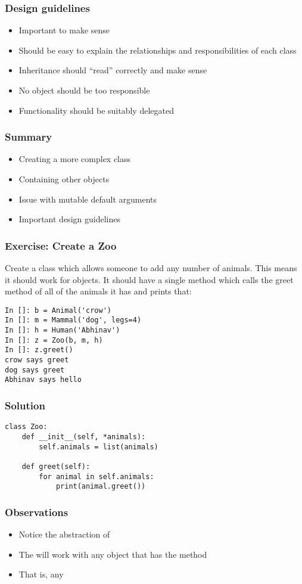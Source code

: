 \documentclass[14pt,compress,aspectratio=169]{beamer}
\begin{document}
\begin{frame}
  \frametitle{Design guidelines}
  \begin{itemize}
  \item Important to make sense
  \item Should be easy to explain the relationships and responsibilities of
    each class
  \item Inheritance should ``read'' correctly and make sense
  \item No object should be too responsible
  \item Functionality should be suitably delegated
  \end{itemize}
\end{frame}

\begin{frame}
  \frametitle{Summary}
  \begin{itemize}
  \item Creating a more complex class
  \item Containing other objects
  \item Issue with mutable default arguments
  \item Important design guidelines
  \end{itemize}
\end{frame}

\begin{frame}
  \frametitle{Exercise: Create a Zoo}
  \begin{block}{}
    Create a  class which allows someone to add any number of animals.
    This means it should work for  objects. It
    should have a single  method which calls the greet method of all
    of the animals it has and prints that:
  \end{block}

\begin{lstlisting}
In []: b = Animal('crow')
In []: m = Mammal('dog', legs=4)
In []: h = Human('Abhinav')
In []: z = Zoo(b, m, h)
In []: z.greet()
crow says greet
dog says greet
Abhinav says hello
\end{lstlisting}
\end{frame}


\begin{frame}
  \frametitle{Solution}
\begin{lstlisting}
class Zoo:
    def __init__(self, *animals):
        self.animals = list(animals)

    def greet(self):
        for animal in self.animals:
            print(animal.greet())
\end{lstlisting}
\end{frame}

\begin{frame}
  \frametitle{Observations}
  \begin{itemize}
  \item Notice the abstraction of 
  \item The  will work with any object that has the  method
  \item That is, any 
  \end{itemize}
\end{frame}
\end{document}
